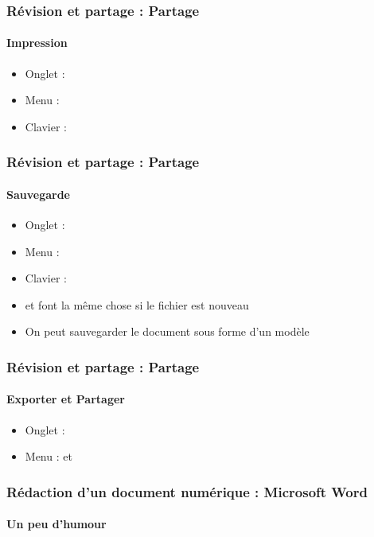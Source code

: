\documentclass[xcolor=table]{beamer}
\begin{document}
\begin{frame}
\frametitle{Révision et partage : Partage}
\framesubtitle{Impression}

\begin{minipage}{0.61\textwidth}
	\begin{itemize}
		\item Onglet : 
		\item Menu : 
		\item Clavier : 
	\end{itemize}
\end{minipage}
\begin{minipage}{0.38\textwidth}
\end{minipage}

\end{frame}

\begin{frame}
\frametitle{Révision et partage : Partage}
\framesubtitle{Sauvegarde}

\begin{minipage}{0.61\textwidth}
	\begin{itemize}
		\item Onglet : 
		\item Menu : 
		\item Clavier : 
		\item {} et  font la même chose si le fichier est nouveau 
		\item On peut sauvegarder le document sous forme d'un modèle 
	\end{itemize}
\end{minipage}
\begin{minipage}{0.38\textwidth}
\end{minipage}

\end{frame}

\begin{frame}
\frametitle{Révision et partage : Partage}
\framesubtitle{Exporter et Partager}

\begin{minipage}{0.38\textwidth}
	\begin{itemize}
		\item Onglet : 
		\item Menu :  et 
	\end{itemize}
\end{minipage}
\begin{minipage}{0.30\textwidth}
\end{minipage}
\begin{minipage}{0.30\textwidth}
\end{minipage}

\end{frame}

\begin{frame}
\frametitle{Rédaction d'un document numérique : Microsoft Word}
\framesubtitle{Un peu d'humour}


\end{frame}

\end{document}
